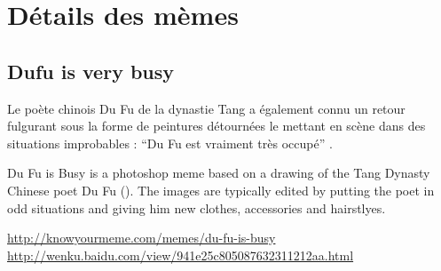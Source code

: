 \section{Détails des mèmes}
\label{sec:fullmemes}
\subsection{Dufu is very busy}



Le poète chinois Du Fu de la dynastie Tang a également connu un retour fulgurant sous la forme de peintures détournées le mettant en scène dans des situations improbables : ``Du Fu est vraiment très occupé'' . 


Du Fu is Busy is a photoshop meme based on a drawing of the Tang Dynasty Chinese poet Du Fu (). The images are typically edited by putting the poet in odd situations and giving him new clothes, accessories and hairstlyes.

\url{http://knowyourmeme.com/memes/du-fu-is-busy}
\url{http://wenku.baidu.com/view/941e25c805087632311212aa.html}

